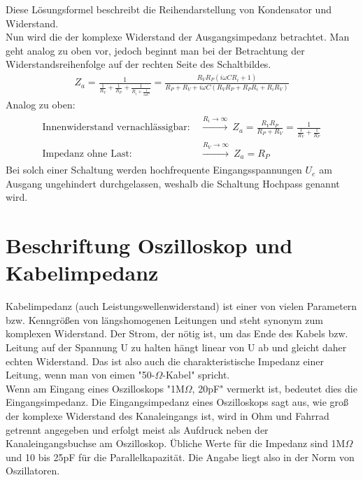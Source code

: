 Diese Lösungsformel beschreibt die Reihendarstellung von Kondensator und Widerstand. \\
Nun wird die der komplexe Widerstand der Ausgangsimpedanz betrachtet. Man geht analog zu oben vor, jedoch beginnt man bei der Betrachtung der Widerstandsreihenfolge auf der rechten Seite des Schaltbildes. 
\begin{align}
    Z_a=\frac{1}{\frac{1}{R_V}+\frac{1}{R_P}+\frac{1}{R_i+\frac{1}{i\omega C}}}=\frac{R_VR_P(i\omega CR_i+1)}{R_P+R_V+i\omega C(R_VR_P+R_PR_i+R_iR_V)}
\end{align}
Analog zu oben:
\begin{align}
    \begin{aligned}
        \text{Innenwiderstand vernachlässigbar:}&~\xrightarrow{R_i\longrightarrow\infty}~Z_a=\frac{R_VR_P}{R_P+R_V}=\frac{1}{\frac{1}{R_V}+\frac{1}{R_P}}\\
        \text{Impedanz ohne Last:}&~\xrightarrow{R_V\rightarrow\infty}~Z_a=R_P
    \end{aligned}
\end{align}
Bei solch einer Schaltung werden hochfrequente Eingangsspannungen $U_e$ am Ausgang ungehindert durchgelassen, weshalb die Schaltung Hochpass genannt wird.
\section{Beschriftung Oszilloskop und Kabelimpedanz}
Kabelimpedanz (auch Leistungswellenwiderstand) ist einer von vielen Parametern bzw.
Kenngrößen von längshomogenen Leitungen und steht synonym zum komplexen Widerstand.
Der Strom, der nötig ist, um das Ende des Kabels bzw. Leitung auf der Spannung U zu halten hängt linear von U ab und gleicht daher echten Widerstand. Das ist also auch die charakteristische Impedanz einer Leitung, wenn man von eimen "50-$\Omega$-Kabel" spricht.\\
Wenn am Eingang eines Oszilloskops "1M$\Omega$, 20pF" vermerkt ist, bedeutet dies die Eingangsimpedanz. Die Eingangsimpedanz eines Oszilloskops sagt aus, wie groß der komplexe Widerstand des Kanaleingangs ist, wird in Ohm und Fahrrad getrennt angegeben und erfolgt meist als Aufdruck neben der Kanaleingangsbuchse am Oszilloskop. Übliche Werte für die Impedanz sind 1M$\Omega$ und 10 bis 25pF für die Parallelkapazität. Die Angabe liegt also in der Norm von Oszillatoren.
